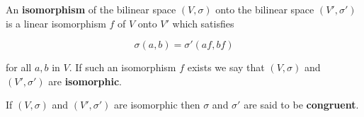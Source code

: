 An \textbf{isomorphism} of the bilinear space $(V, \sigma)$ onto the bilinear space $(V', \sigma')$ is a linear isomorphism $f$ of $V$ onto $V'$ which satisfies

$$\sigma(a, b) = \sigma'(af, bf)$$

for all $a, b$ in $V$. If such an isomorphism $f$ exists we say that $(V, \sigma)$ and $(V', \sigma')$ are \textbf{isomorphic}.

If $(V, \sigma)$ and $(V', \sigma')$ are isomorphic then $\sigma$ and $\sigma'$ are said to be \textbf{congruent}.
